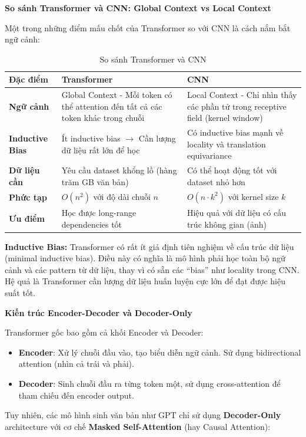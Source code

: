 \textbf{So sánh Transformer và CNN: Global Context vs Local Context}

Một trong những điểm mấu chốt của Transformer so với CNN là cách nắm bắt ngữ cảnh:

\begin{table}[h!]
\centering
\caption{So sánh Transformer và CNN}
\begin{tabular}{|l|p{6cm}|p{6cm}|}
\hline
\textbf{Đặc điểm} & \textbf{Transformer} & \textbf{CNN} \\
\hline
\textbf{Ngữ cảnh} & Global Context - Mỗi token có thể attention đến tất cả các token khác trong chuỗi & Local Context - Chỉ nhìn thấy các phần tử trong receptive field (kernel window) \\
\hline
\textbf{Inductive Bias} & Ít inductive bias $\rightarrow$ Cần lượng dữ liệu rất lớn để học & Có inductive bias mạnh về locality và translation equivariance \\
\hline
\textbf{Dữ liệu cần} & Yêu cầu dataset khổng lồ (hàng trăm GB văn bản) & Có thể hoạt động tốt với dataset nhỏ hơn \\
\hline
\textbf{Phức tạp} & $O(n^2)$ với độ dài chuỗi $n$ & $O(n \cdot k^2)$ với kernel size $k$ \\
\hline
\textbf{Ưu điểm} & Học được long-range dependencies tốt & Hiệu quả với dữ liệu có cấu trúc không gian (ảnh) \\
\hline
\end{tabular}
\end{table}

\textbf{Inductive Bias:} Transformer có rất ít giả định tiên nghiệm về cấu trúc dữ liệu (minimal inductive bias). Điều này có nghĩa là mô hình phải học toàn bộ ngữ cảnh và các pattern từ dữ liệu, thay vì có sẵn các ``bias'' như locality trong CNN. Hệ quả là Transformer cần lượng dữ liệu huấn luyện cực lớn để đạt được hiệu suất tốt.

\textbf{Kiến trúc Encoder-Decoder và Decoder-Only}

Transformer gốc bao gồm cả khối Encoder và Decoder:
\begin{itemize}
    \item \textbf{Encoder}: Xử lý chuỗi đầu vào, tạo biểu diễn ngữ cảnh. Sử dụng bidirectional attention (nhìn cả trái và phải).
    \item \textbf{Decoder}: Sinh chuỗi đầu ra từng token một, sử dụng cross-attention để tham chiếu đến encoder output.
\end{itemize}

Tuy nhiên, các mô hình sinh văn bản như GPT chỉ sử dụng \textbf{Decoder-Only} architecture với cơ chế \textbf{Masked Self-Attention} (hay Causal Attention):

